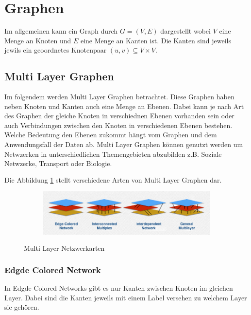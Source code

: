 \section{Graphen}


Im allgemeinen kann ein Graph durch $G = (V, E)$ dargestellt wobei $V$ eine Menge an Knoten und $E$ eine Menge an Kanten ist. Die Kanten sind jeweils jewils ein geoordnetes Knotenpaar $(u, v) \subseteq V \times V$.

\subsection{Multi Layer Graphen}

Im folgendem werden Multi Layer Graphen betrachtet. Diese Graphen haben neben Knoten und Kanten auch eine Menge an Ebenen. Dabei kann je nach Art des Graphen der gleiche Knoten in verschiednen Ebenen vorhanden sein oder auch Verbindungen zwischen den Knoten in verschiedenen Ebenen bestehen.
Welche Bedeutung den Ebenen zukommt hängt vom Graphen und dem Anwendungsfall der Daten ab. Multi Layer Graphen können genutzt werden um Netwzerken in unterschiedlichen Themengebieten abzubilden z.B. Soziale Netwzerke, Transport oder Biologie.

Die Abbildung \ref{network_types} stellt verschiedene Arten von Multi Layer Graphen dar. 

\begin{figure}
  \centering
  \begin{subfigure}[b]{1.0\textwidth}
    \includegraphics[width=1.0\linewidth]{img/network_types.png}
  \end{subfigure}
  \caption{Multi Layer Netzwerkarten}
  \label{network_types}
\end{figure}

\subsubsection{Edgde Colored Network}

In Edgde Colored Networks gibt es nur Kanten zwischen Knoten im gleichen Layer. Dabei sind die Kanten jeweils mit einem Label versehen zu welchem Layer sie gehören.


